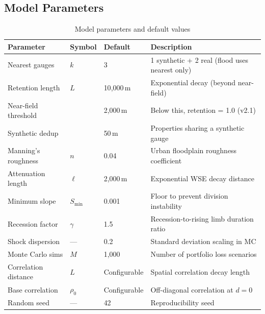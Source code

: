 \documentclass[11pt,a4paper]{article}
\begin{document}
\mkminputs

\subsection{Model Parameters}

\begin{table}[H]
\centering
\begin{tabular}{llll}
    \toprule
    \textbf{Parameter} & \textbf{Symbol} & \textbf{Default} & \textbf{Description} \\
    \midrule
    Nearest gauges       & $k$        & 3          & 1 synthetic + 2 real (flood uses nearest only) \\
    Retention length     & $L$        & 10{,}000\,m & Exponential decay (beyond near-field) \\
    Near-field threshold &            & 2{,}000\,m & Below this, retention = 1.0 (v2.1) \\
    Synthetic dedup      &            & 50\,m      & Properties sharing a synthetic gauge \\
    Manning's roughness  & $n$        & 0.04       & Urban floodplain roughness coefficient \\
    Attenuation length   & $\ell$     & 2{,}000\,m & Exponential WSE decay distance \\
    Minimum slope        & $S_{\min}$ & 0.001      & Floor to prevent division instability \\
    Recession factor     & $\gamma$   & 1.5        & Recession-to-rising limb duration ratio \\
    Shock dispersion     & ---        & 0.2        & Standard deviation scaling in MC \\
    Monte Carlo sims     & $M$        & 1{,}000    & Number of portfolio loss scenarios \\
    Correlation distance & $L$        & Configurable & Spatial correlation decay length \\
    Base correlation     & $\rho_0$   & Configurable & Off-diagonal correlation at $d = 0$ \\
    Random seed          & ---        & 42         & Reproducibility seed \\
    \bottomrule
\end{tabular}
\caption{Model parameters and default values}
\label{tab:params}
\end{table}
\end{document}
